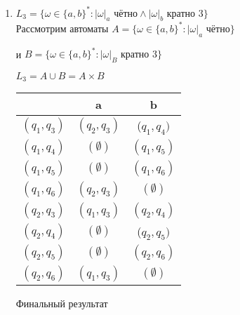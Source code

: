 \documentclass{article}
\begin{document}
\begin{enumerate}
    \item \(L_3=\{\omega \in\{a,b\}^* : |\omega|_a \text{ чётно} \wedge |\omega|_b \text{ кратно } 3 \} \) \\   
     Рассмотрим автоматы 
     \(A=\{\omega\in\{a,b\}^* : |\omega|_a \text{ чётно} \} \) 
      \begin{center}
            \begin{figure}[htbp]
                \centering
                
            \end{figure}
        \end{center}
     и 
     \(B=\{\omega\in\{a,b\}^* : |\omega|_B \text{ кратно } 3 \} \)    
     \begin{center}
            \begin{figure}[htbp]
                \centering
                
            \end{figure}
        \end{center}
     \(L_3 = A \cup B = A \times B \)
    \begin{center}
        \begin{tabular} {|c|c|c|}
            \hline
             & a & b \\
            \hline
            \((q_1,q_3)\) & \((q_2,q_3)\) & (\(q_1,q_4)\) \\
            \hline
            \((q_1,q_4)\) &  $(\emptyset)$ & \((q_1,q_5)\) \\
            \hline
            \((q_1,q_5)\) &  $(\emptyset)$ & \((q_1,q_6)\) \\
            \hline
            \((q_1,q_6)\) & \((q_2,q_3)\) & $(\emptyset)$ \\
            \hline
            \((q_2,q_3)\) & \((q_1,q_3)\) & \((q_2,q_4)\) \\
            \hline
            \((q_2,q_4)\) &  $(\emptyset)$ & (\(q_2,q_5)\) \\
            \hline
            \((q_2,q_5)\) &  $(\emptyset)$ & \((q_2,q_6)\) \\
            \hline
            \((q_2,q_6)\) &  \((q_1,q_3)\) & $(\emptyset)$ \\
            \hline
        \end{tabular}
    \end{center}
    \newpage
    
    Финальный результат
    \begin{center}
            \begin{figure}[htbp]
                \centering
                
            \end{figure}
        \end{center}
        

\end{enumerate}
\end{document}
